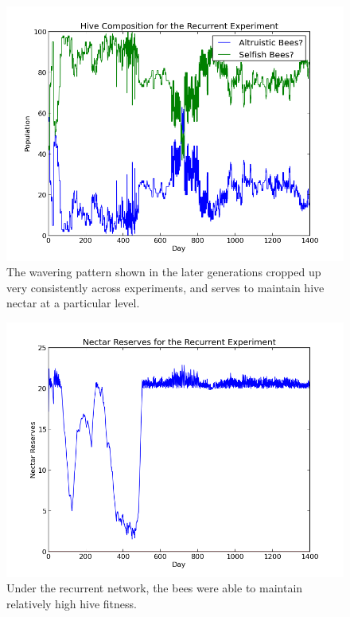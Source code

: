 \documentclass[11pt]{article}
\begin{document}
			\begin{figure}[tb]
				\begin{center}
					\includegraphics[scale=.75]{results/recurrent_comp.png}
				\end{center}
				\caption{The wavering pattern shown in the later generations cropped up very consistently across experiments, and serves to maintain hive nectar at a particular level.}
				\label{fig:recurrent_composition}
			\end{figure}

			\begin{figure}[tb]
				\begin{center}
					\includegraphics[scale=.75]{results/recurrent_res.png}
				\end{center}
				\caption{Under the recurrent network, the bees were able to maintain relatively high hive fitness.}
				\label{fig:recurrent_reserves}
			\end{figure}
\end{document}
